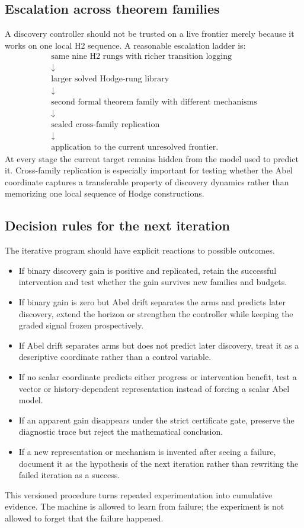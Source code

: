 \subsection{Escalation across theorem families}
A discovery controller should not be trusted on a live frontier merely because it works on one local H2 sequence. A reasonable escalation ladder is:
\[
\begin{array}{c}
\text{same nine H2 rungs with richer transition logging}\\
\downarrow\\
\text{larger solved Hodge-rung library}\\
\downarrow\\
\text{second formal theorem family with different mechanisms}\\
\downarrow\\
\text{sealed cross-family replication}\\
\downarrow\\
\text{application to the current unresolved frontier.}
\end{array}
\]
At every stage the current target remains hidden from the model used to predict it. Cross-family replication is especially important for testing whether the Abel coordinate captures a transferable property of discovery dynamics rather than memorizing one local sequence of Hodge constructions.

\subsection{Decision rules for the next iteration}
The iterative program should have explicit reactions to possible outcomes.
\begin{itemize}
\item If binary discovery gain is positive and replicated, retain the successful intervention and test whether the gain survives new families and budgets.
\item If binary gain is zero but Abel drift separates the arms and predicts later discovery, extend the horizon or strengthen the controller while keeping the graded signal frozen prospectively.
\item If Abel drift separates arms but does not predict later discovery, treat it as a descriptive coordinate rather than a control variable.
\item If no scalar coordinate predicts either progress or intervention benefit, test a vector or history-dependent representation instead of forcing a scalar Abel model.
\item If an apparent gain disappears under the strict certificate gate, preserve the diagnostic trace but reject the mathematical conclusion.
\item If a new representation or mechanism is invented after seeing a failure, document it as the hypothesis of the next iteration rather than rewriting the failed iteration as a success.
\end{itemize}

This versioned procedure turns repeated experimentation into cumulative evidence. The machine is allowed to learn from failure; the experiment is not allowed to forget that the failure happened.
